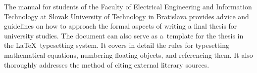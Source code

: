 The manual for students of the Faculty of Electrical 
Engineering and Information Technology
at Slovak University of Technology in Bratislava 
provides advice and guidelines on how to approach
the formal aspects of writing a final thesis
for university studies.
The document can also serve as
a~template for the thesis in the \LaTeX\
typesetting system.
It covers in detail the rules for typesetting 
mathematical equations,
numbering floating objects, and referencing them.
It also thoroughly addresses the method of
citing external literary sources.